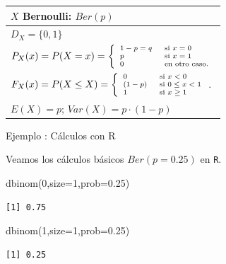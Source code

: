 \documentclass[
  letterpaper,
  DIV=11,
  numbers=noendperiod]{scrreprt}
\newenvironment{Shaded}{\begin{snugshade}}{\end{snugshade}}
\newcommand{\AttributeTok}[1]{\textcolor[rgb]{0.40,0.45,0.13}{#1}}
\newcommand{\DecValTok}[1]{\textcolor[rgb]{0.68,0.00,0.00}{#1}}
\newcommand{\FloatTok}[1]{\textcolor[rgb]{0.68,0.00,0.00}{#1}}
\newcommand{\FunctionTok}[1]{\textcolor[rgb]{0.28,0.35,0.67}{#1}}
\newcommand{\NormalTok}[1]{\textcolor[rgb]{0.00,0.23,0.31}{#1}}
\begin{document}
\renewcommand{\arraystretch}{1.75}
\begin{table}
\centering
\begin{tabular}{|l|}
\hline\rowcolor{LightBlue}
$X$ Bernoulli:  $Ber(p)$ 
\\\hline
$\scriptstyle{ D_X=   \{0,1\}}$  
\\\hline
$\scriptsize{P_X(x)=P(X=x)=
\left\{
\begin{array}{ll}
1-p=q & \mbox{ si } x=0\\
p & \mbox{ si } x=1 \\
0  & \mbox{ en otro caso.}
\end{array}\right.}
$ 
\\\hline
$\scriptsize{  F_X(x)=P(X\leq X)=
\left\{
\begin{array}{ll}
  0 &   \mbox{ si } x<0\\ 
 (1-p)  &  \mbox{ si } 0\leq x< 1 \\ 
1 & \mbox{ si } x\geq 1
\end{array}
\right.}$.
\\\hline
$\scriptstyle E(X)=p$; $\scriptstyle  Var(X)= p \cdot (1-p)$ \\\hline
\end{tabular}
\end{table}

Ejemplo : Cálculos con R

Veamos los cálculos básicos \(Ber(p=0.25)\) en \texttt{R}.

\begin{Shaded}
\begin{Highlighting}[]
\FunctionTok{dbinom}\NormalTok{(}\DecValTok{0}\NormalTok{,}\AttributeTok{size=}\DecValTok{1}\NormalTok{,}\AttributeTok{prob=}\FloatTok{0.25}\NormalTok{)}
\end{Highlighting}
\end{Shaded}

\begin{verbatim}
[1] 0.75
\end{verbatim}

\begin{Shaded}
\begin{Highlighting}[]
\FunctionTok{dbinom}\NormalTok{(}\DecValTok{1}\NormalTok{,}\AttributeTok{size=}\DecValTok{1}\NormalTok{,}\AttributeTok{prob=}\FloatTok{0.25}\NormalTok{)}
\end{Highlighting}
\end{Shaded}

\begin{verbatim}
[1] 0.25
\end{verbatim}
\end{document}

